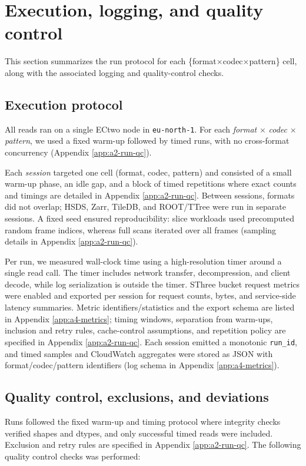 \documentclass[nomenclature, english, bibtex]{kththesis}
\numberwithin{listing}{chapter}
\begin{document}
\section{Execution, logging, and quality control}
\label{sec:execution-logging-qc}
This section summarizes the run protocol for each \{format$\times$codec$\times$pattern\} cell, along with the associated logging and quality-control checks.

\subsection{Execution protocol}
All reads ran on a single \gls{ECtwo} node in \texttt{eu-north-1}. For each \emph{format} $\times$ \emph{codec} $\times$ \emph{pattern}, we used a fixed warm-up followed by timed runs, with no cross-format concurrency (Appendix \ref{app:a2-run-qc}).

Each \emph{session} targeted one cell (format, codec, pattern) and consisted of a small warm-up phase, an idle gap, and a block of timed repetitions where exact counts and timings are detailed in Appendix \ref{app:a2-run-qc}. Between sessions, formats did not overlap; \Gls{HSDS}, Zarr, TileDB, and \gls{ROOT}/\gls{TTree} were run in separate sessions. A fixed seed ensured reproducibility: slice workloads used precomputed random frame indices, whereas full scans iterated over all frames (sampling details in Appendix \ref{app:a2-run-qc}).

Per run, we measured wall-clock time using a high-resolution timer around a single read call. The timer includes network transfer, decompression, and client decode, while log serialization is outside the timer. \gls{SThree} bucket request metrics were enabled and exported per session for request counts, bytes, and service-side latency summaries. Metric identifiers/statistics and the export schema are listed in Appendix \ref{app:a4-metrics}; timing windows, separation from warm-ups, inclusion and retry rules, cache-control assumptions, and repetition policy are specified in Appendix \ref{app:a2-run-qc}. Each session emitted a monotonic \texttt{run\_id}, and timed samples and CloudWatch aggregates were stored as \gls{JSON} with format/codec/pattern identifiers (log schema in Appendix \ref{app:a4-metrics}).

\subsection{Quality control, exclusions, and deviations}
Runs followed the fixed warm-up and timing protocol where integrity checks verified shapes and dtypes, and only successful timed reads were included. Exclusion and retry rules are specified in Appendix \ref{app:a2-run-qc}. The following quality control checks was performed:
\end{document}

